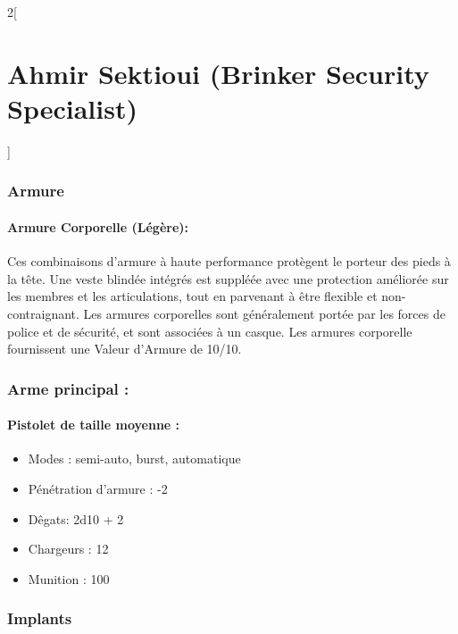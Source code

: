 \documentclass[a4paper,9pt]{article}
\begin{document}
\begin{multicols}{2}[\section*{Ahmir Sektioui (Brinker Security Specialist)}]
   \subsubsection*{Armure}

   \paragraph{Armure Corporelle (Légère):} Ces combinaisons d'armure à haute
   performance protègent le porteur des pieds à la tête. Une veste blindée
   intégrés est suppléée avec une protection améliorée sur les membres et les
   articulations, tout en parvenant à être flexible et non-contraignant. Les
   armures corporelles sont généralement portée par les forces de police et de
   sécurité, et sont associées à un casque. Les armures corporelle fournissent
   une Valeur d'Armure de 10/10. 

   \subsubsection*{Arme principal :}

   \paragraph{Pistolet de taille moyenne :}
   \begin{itemize}
      \item Modes : semi-auto, burst, automatique
      \item Pénétration d'armure : -2
      \item Dêgats: 2d10 + 2
      \item Chargeurs : 12
      \item Munition : 100
   \end{itemize}

   \subsubsection*{Implants}


\end{multicols}
\end{document}
